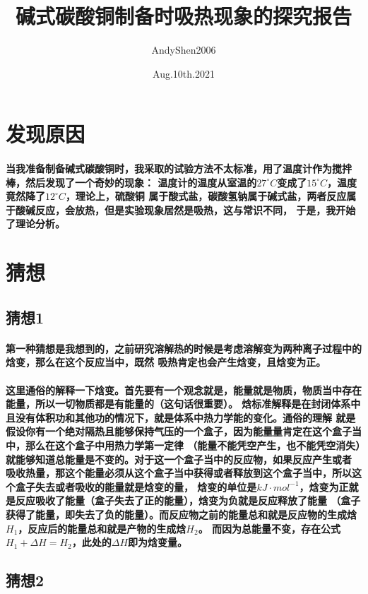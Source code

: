\documentclass[final,11pt,oneside,UTF8]{report}
\title{碱式碳酸铜制备时吸热现象的探究报告}
\author{AndyShen2006}
\date{Aug.10th.2021}
\begin{document}
\maketitle
\section{发现原因}
\paragraph{
    当我准备制备碱式碳酸铜时，我采取的试验方法不太标准，用了温度计作为搅拌棒，然后发现了一个奇妙的现象：
    温度计的温度从室温的$27^\circ C$变成了$15^\circ C$，温度竟然降了$12^\circ C$，理论上，硫酸铜
    属于酸式盐，碳酸氢钠属于碱式盐，两者反应属于酸碱反应，会放热，但是实验现象居然是吸热，这与常识不同，
    于是，我开始了理论分析。
}
\section{猜想}
\subsection{猜想1}
\paragraph{
    第一种猜想是我想到的，之前研究溶解热的时候是考虑溶解变为两种离子过程中的焓变，那么在这个反应当中，既然
    吸热肯定也会产生焓变，且焓变为正。
}
\paragraph{
    这里通俗的解释一下焓变。首先要有一个观念就是，能量就是物质，物质当中存在能量，所以一切物质都是有能量的（这句话很重要）。
    焓标准解释是在封闭体系中且没有体积功和其他功的情况下，就是体系中热力学能的变化。通俗的理解
    就是假设你有一个绝对隔热且能够保持气压的一个盒子，因为能量量肯定在这个盒子当中，那么在这个盒子中用热力学第一定律
    （能量不能凭空产生，也不能凭空消失）就能够知道总能量是不变的。对于这一个盒子当中的反应物，如果反应产生或者
    吸收热量，那这个能量必须从这个盒子当中获得或者释放到这个盒子当中，所以这个盒子失去或者吸收的能量就是焓变的量，
    焓变的单位是$kJ\cdot mol^{-1}$，焓变为正就是反应吸收了能量（盒子失去了正的能量），焓变为负就是反应释放了能量
    （盒子获得了能量，即失去了负的能量）。而反应物之前的能量总和就是反应物的生成焓$H_1$，反应后的能量总和就是产物的生成焓$H_2$。
    而因为总能量不变，存在公式$H_1+\Delta H=H_2$，此处的$\Delta H$即为焓变量。
}
\subsection{猜想2}
\end{document}
